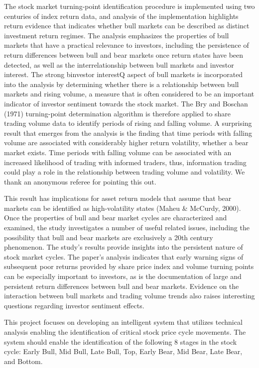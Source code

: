 \documentclass[]{book}
\begin{document}
The stock market turning-point identification procedure is implemented using two centuries of index return data, and analysis of the implementation highlights return evidence that indicates whether bull markets can be described as distinct investment return regimes. The analysis emphasizes the properties of bull markets that have a practical relevance to investors, including the persistence of return differences between bull and bear markets once return states have been detected, as well as the interrelationship between bull markets and investor interest. The strong binvestor interestQ aspect of bull markets is incorporated into the analysis by determining whether there is a relationship between bull markets and rising volume, a measure that is often considered to be an important indicator of investor sentiment towards the stock market. The Bry and Boschan (1971) turning-point determination algorithm is therefore applied to share trading volume data to identify periods of rising and falling volume. A surprising result that emerges from the analysis is the finding that time periods with falling volume are associated with considerably higher return volatility, whether a bear market exists. Time periods with falling volume can be associated with an increased likelihood of trading with informed traders, thus, information trading could play a role in the relationship between trading volume and volatility. We thank an anonymous referee for pointing this out.

This result has implications for asset return models that assume that bear markets can be identified as high-volatility states (Maheu \& McCurdy, 2000). Once the properties of bull and bear market cycles are characterized and examined, the study investigates a number of useful related issues, including the possibility that bull and bear markets are exclusively a 20th century phenomenon. The study's results provide insights into the persistent nature of stock market cycles. The paper's analysis indicates that early warning signs of subsequent poor returns provided by share price index and volume turning points can be especially important to investors, as is the documentation of large and persistent return differences between bull and bear markets. Evidence on the interaction between bull markets and trading volume trends also raises interesting questions regarding investor sentiment effects.

\citep{gonzalez2005two}

This project focuses on developing an intelligent system that utilizes technical analysis enabling the identification of critical stock price cycle movements. The system should enable the identification of the following 8 stages in the stock cycle: Early Bull, Mid Bull, Late Bull, Top, Early Bear, Mid Bear, Late Bear, and Bottom.
\end{document}
